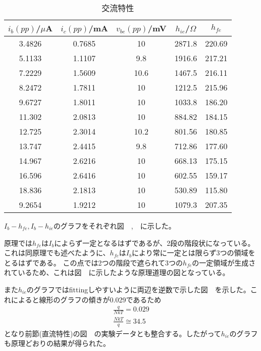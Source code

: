 \documentclass[11pt,a4j,titlepage]{jsarticle}
\begin{document}
 
 \begin{table}[htb]
  \begin{center}
    \caption{交流特性}
    \begin{tabular}{ccccc} \toprule
$i_b(pp)$/$\mu$A	&	$i_c(pp)$/mA	&	$v_{be}(pp)$/mV	&	$h_{ie}$/$\Omega$	&	$h_{fe}$	\\ \midrule
3.4826	&	0.7685	&	10	&	2871.8	&	220.69	\\
5.1133	&	1.1107	&	9.8	&	1916.6	&	217.21	\\
7.2229	&	1.5609	&	10.6	&	1467.5	&	216.11	\\
8.2472	&	1.7811	&	10	&	1212.5	&	215.96	\\
9.6727	&	1.8011	&	10	&	1033.8	&	186.20	\\
11.302	&	2.0813	&	10	&	884.82	&	184.15	\\
12.725	&	2.3014	&	10.2	&	801.56	&	180.85	\\
13.747	&	2.4415	&	9.8	&	712.86	&	177.60	\\
14.967	&	2.6216	&	10	&	668.13	&	175.15	\\
16.596	&	2.6416	&	10	&	602.55	&	159.17	\\
18.836	&	2.1813	&	10	&	530.89	&	115.80	\\
9.2654	&	1.9212	&	10	&	1079.3	&	207.35	\\ \bottomrule
    \end{tabular}
    \label{tab:price}
  \end{center}
  \end{table}
  
  \clearpage
  
  $I_b-h_{fe},I_b-h_{ie}$のグラフをそれぞれ図\ \ ,\ \ に示した。
  
  原理では$h_{fe}$は$I_b$によらず一定となるはずであるが、2段の階段状になっている。これは同原理でも述べたように、$h_{fe}$は$I_b$により常に一定とは限らず3つの領域をとるはずである。
  この点では2つの階段で遮られて3つの$h_{fe}$の一定領域が生成されているため、これは図\ \ に示したような原理道理の図となっている。
  
  また$h_{ie}$のグラフではfittingしやすいように両辺を逆数で示した図\ \ を示した。これによると線形のグラフの傾きが0.029であるため
  \begin{eqnarray}
   \frac{q}{NkT} = 0.029 \nonumber \\
   \frac{NkT}{q} \cong 34.5 \nonumber
  \end{eqnarray}
  となり前節(直流特性)の図\ \ の実験データとも整合する。したがって$h_{ie}$のグラフも原理どおりの結果が得られた。
  
\end{document}
